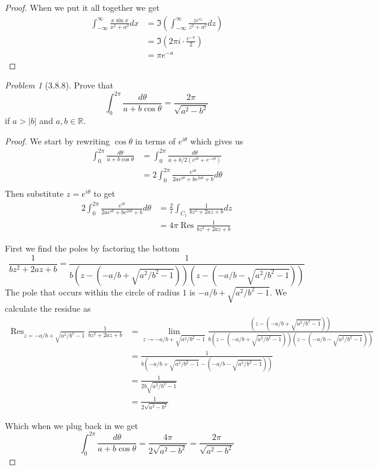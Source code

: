 \documentclass[10pt]{article}
\newcommand{\sk}{\vskip 10mm}
\newcommand{\bb}[1]{\mathbb{#1}}
\DeclareMathOperator{\Res}{Res}
\theoremstyle{remark}
\newtheorem{problem}{Problem}
\theoremstyle{remark}
\begin{document}
\begin{proof}
  When we put it all together we get
  \begin{align*}
    \int_{-\infty}^\infty\frac{x\sin x}{x^2+a^2}dx&=\Im\left(\int_{-\infty}^\infty\frac{ze^{iz}}{z^2+a^2} dz\right)\\
                                               &=\Im(2\pi i\cdot \frac{e^{-a}}{2})\\
                                               &=\pi e^{-a}
  \end{align*}
\end{proof}

\sk

\begin{problem}[3.8.8]
  Prove that
  \[
    \int_0^{2\pi}\frac{d\theta}{a+b\cos\theta}=\frac{2\pi}{\sqrt{a^2-b^2}}
  \]
  if $a>|b|$ and $a,b\in\bb{R}$.
\end{problem}

\begin{proof}
  We start by rewriting $\cos\theta$ in terms of $e^{i\theta}$ which gives us
  \begin{align*}
    \int_0^{2\pi}\frac{d\theta}{a+b\cos\theta} &= \int_0^{2\pi}\frac{d\theta}{a+b/2(e^{i\theta}+e^{-i\theta})}\\
                                            &= 2\int_0^{2\pi}\frac{e^{i\theta}}{2ae^{i\theta}+be^{2i\theta}+b}d\theta\\
  \end{align*}
  Then substitute $z=e^{i\theta}$ to get
  \begin{align*}
    2\int_0^{2\pi}\frac{e^{i\theta}}{2ae^{i\theta}+be^{2i\theta}+b}d\theta&= \frac{2}{i}\int_{C_1}\frac{1}{bz^2+2az+b}dz\\
                                                                     &= 4\pi\Res\frac{1}{bz^2+2az+b}
  \end{align*}

  First we find the poles by factoring the bottom
  \[
    \frac{1}{bz^2+2az+b}=\frac{1}{b(z-(-a/b+\sqrt{a^2/b^2-1}))(z-(-a/b-\sqrt{a^2/b^2-1}))}
  \]
  The pole that occurs within the circle of radius $1$ is $-a/b+\sqrt{a^2/b^2-1}$. We
  calculate the residue as
  \begin{align*}
    \Res_{z=-a/b+\sqrt{a^2/b^2-1}} \frac{1}{bz^2+2az+b} &= \lim_{z\rightarrow -a/b+\sqrt{a^2/b^2-1}}\frac{(z-(-a/b+\sqrt{a^2/b^2-1}))}{b(z-(-a/b+\sqrt{a^2/b^2-1}))(z-(-a/b-\sqrt{a^2/b^2-1}))}\\
                                                     &=\frac{1}{b(-a/b+\sqrt{a^2/b^2-1}-(-a/b-\sqrt{a^2/b^2-1}))}\\
                                                     &=\frac{1}{2b\sqrt{a^2/b^2-1}}\\
                                                     &=\frac{1}{2\sqrt{a^2-b^2}}
  \end{align*}

  Which when we plug back in we get
  \[
    \int_0^{2\pi}\frac{d\theta}{a+b\cos\theta}=\frac{4\pi}{2\sqrt{a^2-b^2}}=\frac{2\pi}{\sqrt{a^2-b^2}}
  \]
\end{proof}
\end{document}

